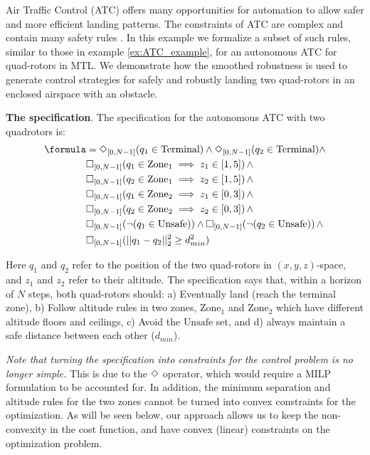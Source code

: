 
Air Traffic Control (ATC) offers many opportunities for automation to allow safer and more efficient landing patterns. 
The constraints of ATC are complex and contain many safety rules \cite{Max_ICRAT16}.
In this example we formalize a subset of such rules, similar to those in example \ref{ex:ATC_example}, for an autonomous ATC for quad-rotors in MTL.
We demonstrate how the smoothed robustness is used to generate control strategies for safely and robustly landing two quad-rotors in an enclosed airspace with an obstacle. 

\textbf{The specification}.
The specification for the autonomous ATC with two quadrotors is:
{\small
\begin{subequations}
\begin{align}
\formula &= \eventually_{[0,N-1]}(q_1 \in \text{Terminal}) \land \eventually_{[0,N-1]}(q_2 \in \text{Terminal}) \land   \nonumber \\
& \always_{[0,N-1]} (q_1 \in \text{Zone}_1 \implies z_1 \in [1,5]) \, \land \nonumber \\
& \always_{[0,N-1]} (q_2 \in \text{Zone}_1 \implies z_2 \in [1,5]) \, \land \nonumber \\
& \always_{[0,N-1]} (q_1 \in \text{Zone}_2 \implies z_1 \in [0,3]) \, \land \nonumber \\
& \always_{[0,N-1]} (q_2 \in \text{Zone}_2 \implies z_2 \in [0,3]) \, \land \nonumber \\
& \always_{[0,N-1]} (\neg (q_1 \in \text{Unsafe})) \land \always_{[0,N-1]} (\neg (q_2 \in \text{Unsafe})) \, \land  \nonumber \\
& \always_{[0,N-1]} (||q_1-q_2||_2^2 \geq d_{min}^2)
\end{align}
\end{subequations}
\vspace{-10pt}
}

Here $q_1$ and $q_2$ refer to the position of the two quad-rotors in $(x,y,z)$-space, and $z_1$ and $z_2$ refer to their altitude. 
The specification says that, within a horizon of $N$ steps,  both quad-rotors 
should: 
a) Eventually land (reach the terminal zone), 
b) Follow altitude rules in two zones, $\text{Zone}_1$ and $\text{Zone}_2$ which have different altitude floors and ceilings,
c) Avoid the $\text{Unsafe}$ set, and d) always maintain a safe distance between each other ($d_{min}$). 

\textit{Note that turning the specification into constraints for the control problem is no longer simple.}
This is due to the $\Diamond$ operator, which would require a MILP formulation to be accounted for. 
In addition, the minimum separation and altitude rules for the two zones cannot be turned into convex constraints for the optimization. As will be seen below, our approach allows us to keep the non-convexity in the cost function, and have convex (linear) constraints on the optimization problem.

